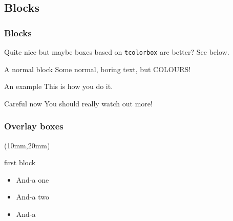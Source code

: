 \documentclass[mathserif, fleqn]{beamer}
\begin{document}
\subsection{Blocks}
\begin{frame}\frametitle{Blocks}
  Quite nice but maybe boxes based on \texttt{tcolorbox} are better? See below.
  \begin{block}{A normal block}
    Some normal, boring text, but COLOURS!
  \end{block}
  \begin{exampleblock}{An example}
    This is how you do it.
  \end{exampleblock}
  \begin{alertblock}{Careful now}
    You should really watch out more!
  \end{alertblock}
\end{frame}

\begin{frame}\frametitle{Overlay boxes}
  \begin{textblock*}{60mm} (10mm,20mm)
    \begin{itembox}{first block}
      \begin{itemize}
      \item And-a one
      \item And-a two
      \item And-a
      \end{itemize}
    \end{itembox}
  \end{textblock*}


\end{frame}
\end{document}
